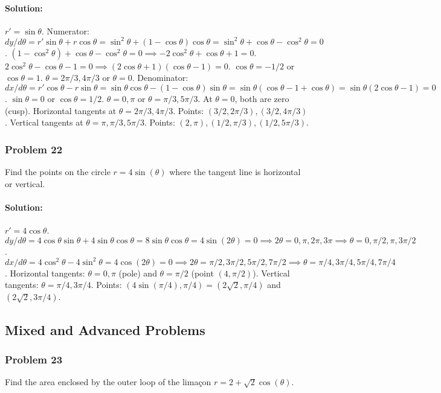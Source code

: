 \documentclass{article}
\begin{document}
\paragraph{Solution:}
$r'=\sin\theta$.
Numerator: $dy/d\theta = r'\sin\theta + r\cos\theta = \sin^2\theta + (1-\cos\theta)\cos\theta = \sin^2\theta + \cos\theta - \cos^2\theta = 0$.
$(1-\cos^2\theta) + \cos\theta - \cos^2\theta = 0 \implies -2\cos^2\theta + \cos\theta + 1 = 0$.
$2\cos^2\theta - \cos\theta - 1 = 0 \implies (2\cos\theta+1)(\cos\theta-1)=0$.
$\cos\theta = -1/2$ or $\cos\theta=1$. $\theta = 2\pi/3, 4\pi/3$ or $\theta=0$.
Denominator: $dx/d\theta = r'\cos\theta - r\sin\theta = \sin\theta\cos\theta - (1-\cos\theta)\sin\theta = \sin\theta(\cos\theta - 1 + \cos\theta) = \sin\theta(2\cos\theta-1)=0$.
$\sin\theta=0$ or $\cos\theta=1/2$. $\theta = 0, \pi$ or $\theta = \pi/3, 5\pi/3$.
At $\theta=0$, both are zero (cusp).
Horizontal tangents at $\theta = 2\pi/3, 4\pi/3$. Points: $(3/2, 2\pi/3), (3/2, 4\pi/3)$.
Vertical tangents at $\theta = \pi, \pi/3, 5\pi/3$. Points: $(2, \pi), (1/2, \pi/3), (1/2, 5\pi/3)$.

\subsubsection*{Problem 22}
Find the points on the circle $r = 4\sin(\theta)$ where the tangent line is horizontal or vertical.
\paragraph{Solution:}
$r'=4\cos\theta$.
$dy/d\theta = 4\cos\theta\sin\theta + 4\sin\theta\cos\theta = 8\sin\theta\cos\theta = 4\sin(2\theta)=0 \implies 2\theta=0, \pi, 2\pi, 3\pi \implies \theta=0, \pi/2, \pi, 3\pi/2$.
$dx/d\theta = 4\cos^2\theta - 4\sin^2\theta = 4\cos(2\theta)=0 \implies 2\theta=\pi/2, 3\pi/2, 5\pi/2, 7\pi/2 \implies \theta=\pi/4, 3\pi/4, 5\pi/4, 7\pi/4$.
Horizontal tangents: $\theta=0, \pi$ (pole) and $\theta=\pi/2$ (point $(4, \pi/2)$).
Vertical tangents: $\theta=\pi/4, 3\pi/4$. Points: $(4\sin(\pi/4), \pi/4)=(2\sqrt{2}, \pi/4)$ and $(2\sqrt{2}, 3\pi/4)$.


\subsection*{Mixed and Advanced Problems}

\subsubsection*{Problem 23}
Find the area enclosed by the outer loop of the limaçon $r=2+\sqrt{2}\cos(\theta)$.
\end{document}
